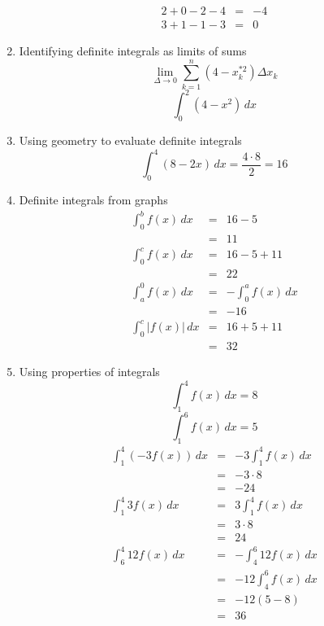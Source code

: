 \documentclass{article}
\begin{document}
\begin{enumerate}
\begin{eqnarray}
            2 + 0 - 2 - 4 &=& -4 \\
            3 + 1 - 1 - 3 &=& 0
        \end{eqnarray}
    \item Identifying definite integrals as limits of sums
        $$\lim_{\Delta \to 0}{\sum_{k = 1}^{n}{\left(4 - x_k^{*2}\right)\Delta{x_k}}}$$
        $$\int_0^2{\left(4-x^2\right)\,dx}$$
    \item Using geometry to evaluate definite integrals
        $$\int_0^4{\left(8 - 2x\right)\,dx} = \frac{4 \cdot 8}{2} = 16$$
    \item Definite integrals from graphs
        \begin{eqnarray}
            \int_0^b{f(x)\,dx} &=& 16 - 5 \\
                               &=& 11 \\
            \int_0^c{f(x)\,dx} &=& 16 - 5 + 11 \\
                               &=& 22 \\
            \int_a^0{f(x)\,dx} &=& -\int_0^a{f(x)\,dx} \\
                               &=& -16 \\
            \int_0^c{|f(x)|\,dx} &=& 16 + 5 + 11 \\
                                 &=& 32
        \end{eqnarray}
    \item Using properties of integrals
        $$\int_1^4{f(x)\,dx} = 8$$
        $$\int_1^6{f(x)\,dx} = 5$$
        \begin{eqnarray}
            \int_1^4{\left(-3f(x)\right)\,dx} &=& -3\int_1^4{f(x)\,dx} \\
                                              &=& -3 \cdot 8 \\
                                              &=& -24 \\
            \int_1^4{3f(x)\,dx} &=& 3\int_1^4{f(x)\,dx} \\
                                &=& 3 \cdot 8 \\
                                &=& 24 \\
            \int_6^4{12f(x)\,dx} &=& -\int_4^6{12f(x)\,dx} \\
                                 &=& -12\int_4^6{f(x)\,dx} \\
                                 &=& -12\left(5 - 8\right) \\
                                 &=& 36 \\

\end{eqnarray}
\end{enumerate}
\end{document}
